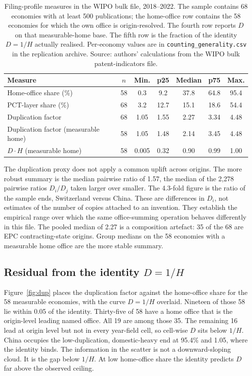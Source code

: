 \documentclass[a4paper,fleqn]{cas-dc}
\begin{document}
\begin{table}[t]
\caption{Filing-profile measures in the WIPO bulk file, 2018--2022.
The sample contains 68 economies with at least 500 publications; the
home-office row contains the 58 economies for which the own office is
origin-resolved. The fourth row reports $D$ on that measurable-home base.
The fifth row is the fraction of the identity $D=1/H$ actually realised.
Per-economy values are in \texttt{counting\_generality.csv}
in the replication archive. Source: authors' calculations from the WIPO bulk
patent-indicators file.}
\label{tab:range}
\centering
\small
\begin{tabular}{@{}lcccccc@{}}
\toprule
Measure & $n$ & Min. & p25 & Median & p75 & Max. \\
\midrule
Home-office share (\%) & 58 & 0.3 & 9.2 & 37.8 & 64.8 & 95.4 \\
PCT-layer share (\%) & 68 & 3.2 & 12.7 & 15.1 & 18.6 & 54.4 \\
Duplication factor & 68 & 1.05 & 1.55 & 2.27 & 3.34 & 4.48 \\
Duplication factor (measurable home) & 58 & 1.05 & 1.48 & 2.14 & 3.45 & 4.48 \\
$D\cdot H$ (measurable home) & 58 & 0.005 & 0.32 & 0.90 & 0.99 & 1.00 \\
\bottomrule
\end{tabular}
\end{table}

The duplication proxy does not apply a common uplift across origins. The more
robust summary is the median pairwise ratio of 1.57, the median of the 2,278
pairwise ratios $D_i/D_j$ taken larger over smaller. The 4.3-fold figure is
the ratio of the sample ends, Switzerland versus China. These are differences
in $D_i$, not estimates of the number of copies attached to an invention.
They establish the empirical range over which the same office-summing
operation behaves differently in this file. The pooled median of 2.27 is a
composition artefact: 35 of the 68 are EPC contracting-state origins. Group
medians on the 58 economies with a measurable home office are the more stable
summary.

\subsection{Residual from the identity $D=1/H$}\label{sec:dup-result}

Figure~\ref{fig:dup} places the duplication factor against the home-office
share for the 58 measurable economies, with the curve $D=1/H$ overlaid.
Nineteen of those 58 lie within 0.05 of the identity. Thirty-five of 58 have
a home office that is the origin-level leading named office. All 19 are among
those 35. The remaining 16 lead at origin level but not in every year-field
cell, so cell-wise $D$ sits below $1/H$. China occupies the low-duplication,
domestic-heavy end at 95.4\% and 1.05, where the identity binds. The
information in the scatter is not a downward-sloping cloud. It is the gap
below $1/H$. At low home-office share the identity predicts $D$ far above the
observed ceiling.
\end{document}

